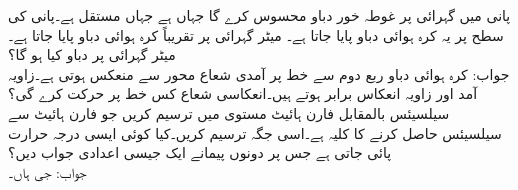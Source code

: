 \quad 
پانی میں  گہرائی پر غوطہ خور  دباو محسوس کرے گا جہاں  ہے جہاں  مستقل ہے۔پانی کی سطح پر یہ  کرہ ہوائی دباو پایا جاتا ہے۔  میٹر گہرائی پر تقریباً   کرہ ہوائی دباو پایا جاتا ہے۔ میٹر گہرائی پر دباو کیا ہو گا؟\\
جواب:\quad
{} کرہ ہوائی دباو
\quad
ربع دوم سے خط  پر آمدی شعاع  محور سے منعکس ہوتی ہے۔زاویہ آمد اور زاویہ انعکاس برابر ہوتے ہیں۔انعکاسی شعاع کس خط پر حرکت کرے گی؟
\quad 
سیلسیئس بالمقابل فارن ہائیٹ مستوی  میں  ترسیم کریں جو فارن ہائیٹ سے سیلسیئس حاصل کرنے کا کلیہ ہے۔اسی جگہ  ترسیم کریں۔کیا کوئی ایسی درجہ حرارت پائی جاتی ہے جس پر دونوں پیمانے ایک جیسی اعدادی جواب دیں؟\\
جواب:\quad
جی ہاں۔ 

\\

